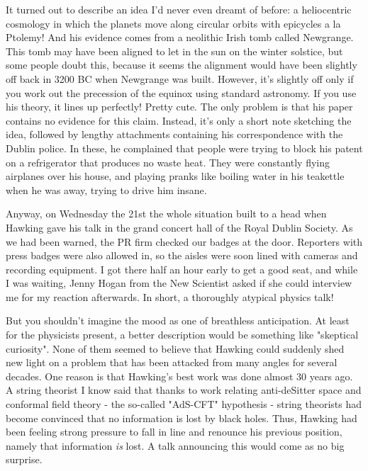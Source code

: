 It turned out to describe an idea I'd never even dreamt of before: 
a heliocentric cosmology in which the planets move along circular orbits 
with epicycles a la Ptolemy!  And his evidence comes from a neolithic 
Irish tomb called Newgrange.  This tomb may have been aligned to let 
in the sun on the winter solstice, but some people doubt this, because
it seems the alignment would have been slightly off back in 3200 BC when 
Newgrange was built.  However, it's slightly off only if you work out 
the precession of the equinox using standard astronomy.  If you use his 
theory, it lines up perfectly!   Pretty cute.  The only problem is that 
his paper contains no evidence for this claim.  Instead, it's only a 
short note sketching the idea, followed by lengthy attachments containing 
his correspondence with the Dublin police.  In these, he complained that 
people were trying to block his patent on a refrigerator that produces no 
waste heat.  They were constantly flying airplanes over his house, and 
playing pranks like boiling water in his teakettle when he was away, trying 
to drive him insane.   

Anyway, on Wednesday the 21st the whole situation built to a head when 
Hawking gave his talk in the grand concert hall of the Royal Dublin Society.  
As we had been warned, the PR firm checked our badges at the door.  Reporters
with press badges were also allowed in, so the aisles were soon lined with 
cameras and recording equipment.  I got there half an hour early to get a 
good seat, and while I was waiting, Jenny Hogan from the New Scientist 
asked if she could interview me for my reaction afterwards.   In short, 
a thoroughly atypical physics talk!  

But you shouldn't imagine the mood as one of breathless anticipation.  At 
least for the physicists present, a better description would be something 
like "skeptical curiosity".  None of them seemed to believe that Hawking 
could suddenly shed new light on a problem that has been attacked from 
many angles for several decades.  One reason is that Hawking's best work 
was done almost 30 years ago.  A string theorist I know said that thanks 
to work relating anti-deSitter space and conformal field theory - the 
so-called "AdS-CFT" hypothesis - string theorists had become convinced 
that no information is lost by black holes.   Thus, Hawking had been 
feeling strong pressure to fall in line and renounce his previous position, 
namely that information \emph{is} lost.  A talk announcing this would come 
as no big surprise.  

